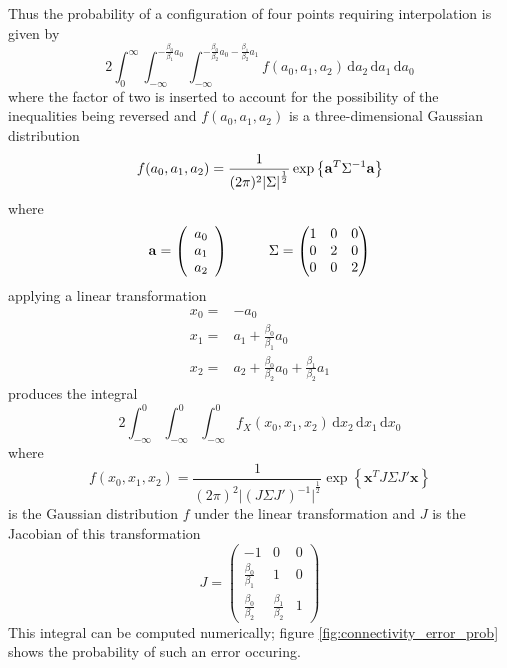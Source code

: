 \documentclass{report}
\newcommand{\xx}[0]{\mathbf{x}}
\newcommand{\ud}{\,\mathrm{d}}
\begin{document}
Thus the probability of a configuration of four points requiring interpolation is given by
\begin{equation}
  2 \int_{0}^{\infty} \int_{-\infty}^{-\frac{\beta_{0}}{\beta_{1}} a_{0}} \int_{-\infty}^{-\frac{\beta_{0}}{\beta_{2}} a_{0} - \frac{\beta_{1}}{\beta_{2}} a_{1}} f(a_{0}, a_{1}, a_{2}) \ud a_{2} \ud a_{1} \ud a_{0}
\end{equation}
where the factor of two is inserted to account for the possibility of the inequalities being reversed and $f(a_{0}, a_{1}, a_{2})$ is a three-dimensional Gaussian distribution
\[
f(a_{0}, a_{1}, a_{2}) = \frac{1}{(2 \pi)^{2} {\vert \Sigma \vert}^{\frac{1}{2}}} \exp{\left\{ {\bf a}^{T} \Sigma^{-1} {\bf a} \right\}}
\]
where
\[
{\bf a} = \left(
\begin{array}{c}
  a_{0} \\
  a_{1} \\
  a_{2}
\end{array}
\right)
\hspace{1 cm}
\Sigma = \begin{pmatrix}
  1 & 0 & 0 \\
  0 & 2 & 0 \\
  0 & 0 & 2
\end{pmatrix}
\]
applying a linear transformation
\begin{align*}
  x_{0} = & -a_{0} \\
  x_{1} = & a_{1} + \frac{\beta_{0}}{\beta_{1}} a_{0} \\
  x_{2} = & a_{2} + \frac{\beta_{0}}{\beta_{2}} a_{0} + \frac{\beta_{1}}{\beta_{2}} a_{1}
\end{align*}
produces the integral
\begin{equation}
  2 \int_{-\infty}^{0} \int_{-\infty}^{0} \int_{-\infty}^{0} f_{X}(x_{0}, x_{1}, x_{2}) \ud x_{2} \ud x_{1} \ud x_{0}
\end{equation}
where
\[
f(x_{0}, x_{1}, x_{2}) = \frac{1}{(2 \pi)^{2} {\vert (J \Sigma J')^{-1} \vert}^{\frac{1}{2}}} \exp{\left\{ \xx^{T} J \Sigma J' \xx \right\}}
\]
is the Gaussian distribution $f$ under the linear transformation and $J$ is the Jacobian of this transformation
\[
J = \begin{pmatrix}
  -1 & 0 & 0 \\
  \frac{\beta_{0}}{\beta_{1}} & 1 & 0 \\ 
  \frac{\beta_{0}}{\beta_{2}} & \frac{\beta_{1}}{\beta_{2}} & 1
\end{pmatrix}
\]
This integral can be computed numerically; figure \ref{fig:connectivity_error_prob} shows the probability of such an error occuring.
\end{document}
